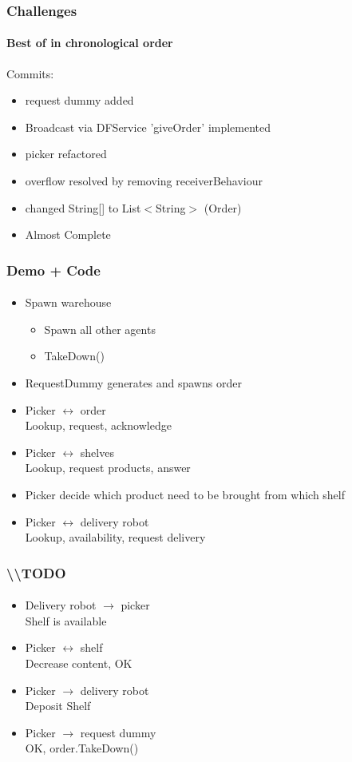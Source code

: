 \documentclass{beamer}
\begin{document}
\begin{frame}[fragile]
\frametitle{Challenges}
\framesubtitle{Best of in chronological order}

Commits:
\begin{itemize}
\item request dummy added
\item Broadcast via DFService 'giveOrder' implemented
\item picker refactored
\item overflow resolved by removing receiverBehaviour
\item changed String[] to List$<$String$>$ (Order)
\item Almost Complete
\end{itemize}

\end{frame}

\begin{frame}[fragile]
\frametitle{Demo + Code}
\framesubtitle{}

\begin{itemize}
\item Spawn warehouse
	\begin{itemize}
	\item Spawn all other agents
	\item TakeDown()
	\end{itemize}
\item RequestDummy generates and spawns order
\item Picker $\leftrightarrow$ order\\
Lookup, request, acknowledge
\item Picker $\leftrightarrow$ shelves\\
Lookup, request products, answer
\item Picker decide which product need to be brought from which shelf
\item Picker $\leftrightarrow$  delivery robot\\
Lookup, availability, request delivery
\end{itemize}


\end{frame}


\begin{frame}[fragile]
\frametitle{\textbf{\textbackslash \textbackslash TODO}}
\framesubtitle{}

\begin{itemize}
\item Delivery robot $\rightarrow$ picker\\
Shelf is available
\item Picker $\leftrightarrow$ shelf\\
Decrease content, OK
\item Picker $\rightarrow$ delivery robot\\
Deposit Shelf
\item Picker $\rightarrow$ request dummy\\
OK, order.TakeDown()
\end{itemize}

\end{frame}
\end{document}
